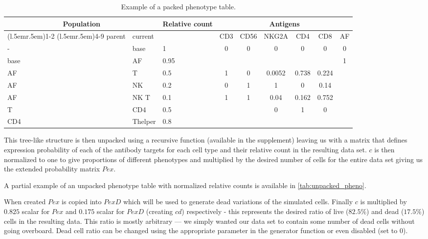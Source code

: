  
\begin{table}
\small\sf
\label{tab:packed_pheno}
\begin{tabular}{lllcccccc}\toprule 
\multicolumn{2}{c}{Population}  &  \multirow{2}{3.5em}{Relative count} & \multicolumn{6}{c}{Antigens}\\ 
\cmidrule(l{.5em}r{.5em}){1-2}
\cmidrule(l{.5em}r{.5em}){4-9}
parent & current & {} & CD3 & CD56 & NKG2A  & CD4   & CD8   & AF\\
\midrule
-           & base    & 1             & 0   & 0    & 0      & 0     & 0     & 0  \\
base        & AF      & 0.95          &     &      &        &       &       & 1  \\
AF          & T       & 0.5           & 1   & 0    & 0.0052 & 0.738 & 0.224 &    \\
AF          & NK      & 0.2           & 0   & 1    & 1      & 0     & 0.14  &    \\
AF          & NK T    & 0.1           & 1   & 1    & 0.04   & 0.162 & 0.752 &    \\
T           & CD4     & 0.5           &     &      & 0      & 1     & 0     &    \\
CD4         & Thelper & 0.8           &     &      &        &       &       &   \\
\bottomrule
\end{tabular}
\caption{Example of a packed phenotype table.}
\end{table}


  This tree-like structure is then unpacked using a recursive function (available in the supplement) leaving us with a matrix that defines expression probability of each of the antibody targets for each cell type and their relative count in the resulting data set. $c$ is then normalized to one to give proportions of different phenotypes and multiplied by the desired number of cells for the entire data set giving us the extended probability matrix $Pex$.
  
  A partial example of an unpacked phenotype table with normalized relative counts is available in \cref{tab:unpacked_pheno}.
  
  When created $Pex$ is copied into $PexD$ which will be used to generate dead variations of the simulated cells. Finally $c$ is multiplied by $0.825$ scalar for $Pex$ and $0.175$ scalar for $PexD$ (creating $cd$) respectively - this represents the desired ratio of live ($82.5\%$) and dead ($17.5\%$) cells in the resulting data. This ratio is mostly arbitrary --- we simply wanted our data set to contain some number of dead cells without going overboard. Dead cell ratio can be changed using the appropriate parameter in the generator function or even disabled (set to 0).
  
